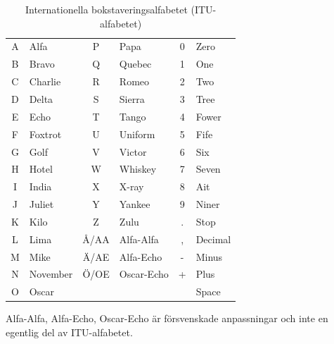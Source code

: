 \begin{table}[H]
\centering
\begin{tabular}{cl|cl|cl}
	A & Alfa     &  P   & Papa       & 0 & Zero    \\
	B & Bravo    &  Q   & Quebec     & 1 & One     \\
	C & Charlie  &  R   & Romeo      & 2 & Two     \\
	D & Delta    &  S   & Sierra     & 3 & Tree    \\
	E & Echo     &  T   & Tango      & 4 & Fower   \\
	F & Foxtrot  &  U   & Uniform    & 5 & Fife    \\
	G & Golf     &  V   & Victor     & 6 & Six     \\
	H & Hotel    &  W   & Whiskey    & 7 & Seven   \\
	I & India    &  X   & X-ray      & 8 & Ait     \\
	J & Juliet   &  Y   & Yankee     & 9 & Niner   \\
	K & Kilo     &  Z   & Zulu       & . & Stop    \\
	L & Lima     & Å/AA & Alfa-Alfa  & , & Decimal \\
	M & Mike     & Ä/AE & Alfa-Echo  & - & Minus   \\
	N & November & Ö/OE & Oscar-Echo & + & Plus    \\
	O & Oscar    &      &            &   & Space   \\
\end{tabular}
\caption{Internationella bokstaveringsalfabetet (ITU-alfabetet)}
\end{table}

Alfa-Alfa, Alfa-Echo, Oscar-Echo är försvenskade anpassningar och inte
en egentlig del av ITU-alfabetet.
